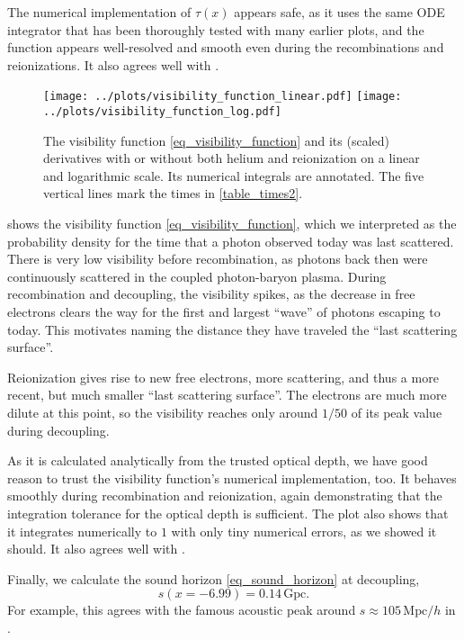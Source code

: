 \documentclass[10pt,a4paper]{article}
\begin{document}
The numerical implementation of $\tau(x)$ appears safe, as it uses the same ODE integrator that has been thoroughly tested with many earlier plots,
and the function appears well-resolved and smooth even during the recombinations and reionizations.
It also agrees well with \cite[\textsc{fig. 2}]{callinHowCalculateCMB2006}.

\begin{figure}[t]
	\centering
	\texttt{[image: ../plots/visibility\_function\_linear.pdf]}
	\texttt{[image: ../plots/visibility\_function\_log.pdf]}
	\caption{
		The visibility function \eqref{eq_visibility_function} and its (scaled) derivatives with or without both helium and reionization on a linear and logarithmic scale.
		Its numerical integrals are annotated.
		The five vertical lines mark the times in \cref{table_times2}.
	}
	\label{fig_visibility_function}
\end{figure}

 shows the visibility function \eqref{eq_visibility_function},
which we interpreted as the probability density for the time that a photon observed today was last scattered.
There is very low visibility before recombination, as photons back then were continuously scattered in the coupled photon-baryon plasma.
During recombination and decoupling, the visibility spikes, as the decrease in free electrons clears the way for the first and largest ``wave'' of photons escaping to today.
This motivates naming the distance they have traveled the ``last scattering surface''.

Reionization gives rise to new free electrons, more scattering, and thus a more recent, but much smaller ``last scattering surface''.
The electrons are much more dilute at this point, so the visibility reaches only around $1/50$ of its peak value during decoupling.

As it is calculated analytically from the trusted optical depth, we have good reason to trust the visibility function's numerical implementation, too.
It behaves smoothly during recombination and reionization, again demonstrating that the integration tolerance for the optical depth is sufficient.
The plot also shows that it integrates numerically to $1$ with only tiny numerical errors, as we showed it should.
It also agrees well with \cite[\textsc{fig. 3}]{callinHowCalculateCMB2006}.

Finally, we calculate the sound horizon \eqref{eq_sound_horizon} at decoupling,
\begin{equation}
	s(x=-6.99) = 0.14\,\mathrm{Gpc}.
\end{equation}
For example, this agrees with the famous acoustic peak around $s \approx 105\,\mathrm{Mpc}/h$ in \cite[\textsc{Fig. 2}]{eisensteinDetectionBaryonAcoustic2005}.
\end{document}
